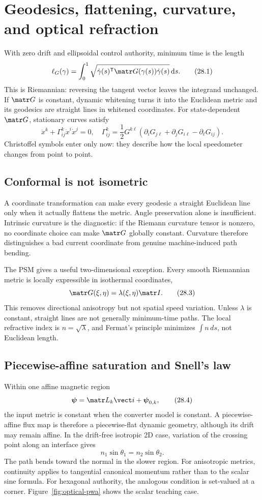 \section{Geodesics, flattening, curvature, and optical refraction}
\label{sec:geodesics-curvature}

With zero drift and ellipsoidal control authority, minimum time is the length
\[
 \ell_G(\gamma)=\int_0^1
 \sqrt{\dot\gamma(s)^{\mathsf T}\matr G(\gamma(s))\dot\gamma(s)}\,\mathrm ds.
 \tag{28.1}
\]
This is Riemannian: reversing the tangent vector leaves the integrand
unchanged.  If \(\matr G\) is constant, dynamic whitening turns it into the
Euclidean metric and its geodesics are straight lines in whitened coordinates.
For state-dependent \(\matr G\), stationary curves satisfy
\[
 \ddot x^k+\Gamma^k_{ij}\dot x^i\dot x^j=0,
 \quad
 \Gamma^k_{ij}=\frac12G^{k\ell}
 (\partial_iG_{j\ell}+\partial_jG_{i\ell}-\partial_\ell G_{ij}).
 \tag{28.2}
\]
Christoffel symbols enter only now: they describe how the local speedometer
changes from point to point.

\subsection{Conformal is not isometric}

A coordinate transformation can make every geodesic a straight Euclidean line
only when it actually flattens the metric.  Angle preservation alone is
insufficient.  Intrinsic curvature is the diagnostic: if the Riemann curvature
tensor is nonzero, no coordinate choice can make \(\matr G\) globally
constant.  Curvature therefore distinguishes a bad current coordinate from
genuine machine-induced path bending.

The PSM gives a useful two-dimensional exception.  Every smooth Riemannian
metric is locally expressible in isothermal coordinates,
\[
 \matr G(\xi,\eta)=\lambda(\xi,\eta)\matr I.
 \tag{28.3}
\]
This removes directional anisotropy but not spatial speed variation.  Unless
\(\lambda\) is constant, straight lines are not generally minimum-time paths.
The local refractive index is \(n=\sqrt{\lambda}\), and Fermat's principle
minimizes \(\int n\,ds\), not Euclidean length.

\subsection{Piecewise-affine saturation and Snell's law}

Within one affine magnetic region
\[
 \boldsymbol\psi=\matr L_k\vect i+\boldsymbol\psi_{0,k},
 \tag{28.4}
\]
the input metric is constant when the converter model is constant.  A
piecewise-affine flux map is therefore a piecewise-flat dynamic geometry,
although its drift may remain affine.  In the drift-free isotropic 2D case,
variation of the crossing point along an interface gives
\[
 \boxed{n_1\sin\theta_1=n_2\sin\theta_2.}
 \tag{28.5}
\]
The path bends toward the normal in the slower region.  For anisotropic
metrics, continuity applies to tangential canonical momentum rather than to
the scalar sine formula.  For hexagonal authority, the analogous condition is
set-valued at a corner.  Figure~\ref{fig:optical-pwa} shows the scalar teaching
case.

